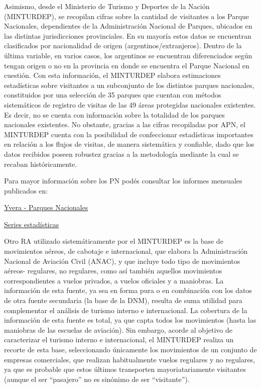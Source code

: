 \documentclass[
]{book}
\begin{document}
Asimismo, desde el Ministerio de Turismo y Deportes de la Nación (MINTURDEP), se recopilan cifras sobre la cantidad de visitantes a los Parque Nacionales, dependientes de la Administración Nacional de Parques, ubicados en las distintas jurisdicciones provinciales. En su mayoría estos datos se encuentran clasificados por nacionalidad de origen (argentinos/extranjeros). Dentro de la última variable, en varios casos, los argentinos se encuentran diferenciados según tengan origen o no en la provincia en donde se encuentra el Parque Nacional en cuestión. Con esta información, el MINTURDEP elabora estimaciones estadísticas sobre visitantes a un subconjunto de los distintos parques nacionales, constituidos por una selección de 35 parques que cuentan con métodos sistemáticos de registro de visitas de las 49 áreas protegidas nacionales existentes. Es decir, no se cuenta con información sobre la totalidad de los parques nacionales existentes. No obstante, gracias a las cifras recopiladas por APN, el MINTURDEP cuenta con la posibilidad de confeccionar estadísticas importantes en relación a los flujos de visitas, de manera sistemática y confiable, dado que los datos recibidos poseen robustez gracias a la metodología mediante la cual se recaban históricamente.

Para mayor información sobre los PN podés consultar los informes mensuales publicados en:

\href{https://www.yvera.tur.ar/estadistica/informe/info/parques-nacionales}{Yvera - Parques Nacionales}

\href{http://datos.yvera.gob.ar/dataset/parques-nacionales}{Series estadísticas}

Otro RA utilizado sistemáticamente por el MINTURDEP es la base de movimientos aéreos, de cabotaje e internacional, que elabora la Administración Nacional de Aviación Civil (ANAC), y que incluye todo tipo de movimientos aéreos- regulares, no regulares, como así también aquellos movimientos correspondientes a vuelos privados, a vuelos oficiales y a maniobras. La información de esta fuente, ya sea en forma pura o en combinación con los datos de otra fuente secundaria (la base de la DNM), resulta de suma utilidad para complementar el análisis de turismo interno e internacional. La cobertura de la información de esta fuente es total, ya que capta todos los movimientos (hasta las maniobras de las escuelas de aviación). Sin embargo, acorde al objetivo de caracterizar el turismo interno e internacional, el MINTURDEP realiza un recorte de esta base, seleccionando únicamente los movimientos de un conjunto de empresas comerciales, que realizan habitualmente vuelos regulares y no regulares, ya que es probable que estos últimos transporten mayoriatariamente visitantes (aunque el ser ``pasajero'' no es sinónimo de ser ``visitante'').
\end{document}

